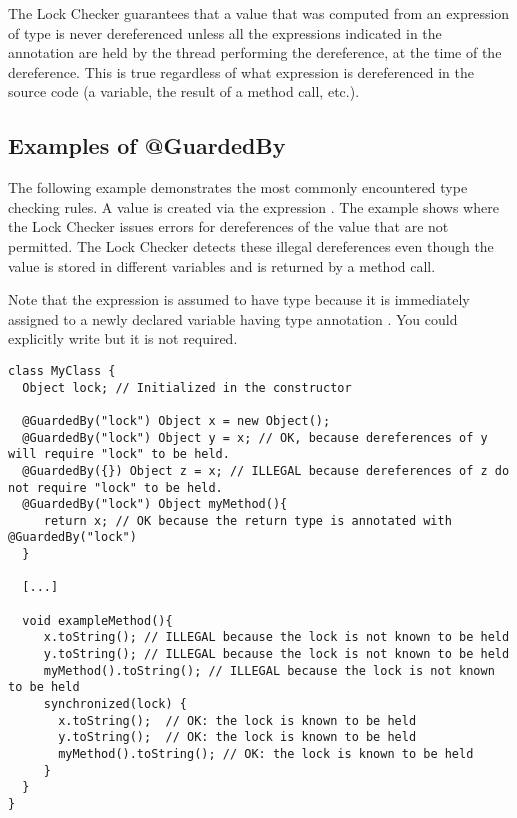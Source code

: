 The Lock Checker guarantees that a value that was computed from an expression of  type is
never dereferenced unless all the expressions indicated in the
 annotation are held by the thread performing the
dereference, at the time of the dereference.  This is true regardless of what
expression is dereferenced in the source code (a variable, the result of a method call, etc.).

\subsection{Examples of @GuardedBy\label{lock-examples-guardedby}}

The following example demonstrates the most commonly encountered
type checking rules.  A value is created via the expression
.  The example shows where the Lock Checker issues errors
for dereferences of the value that are not permitted.  The Lock Checker
detects these illegal dereferences even though the value is stored in
different variables and is returned by a method call.

Note that the expression  is assumed to have type 
because it is immediately assigned to a newly declared
variable having type annotation .  You could
explicitly write  but it is not
required.

\begin{Verbatim}
class MyClass {
  Object lock; // Initialized in the constructor

  @GuardedBy("lock") Object x = new Object();
  @GuardedBy("lock") Object y = x; // OK, because dereferences of y will require "lock" to be held.
  @GuardedBy({}) Object z = x; // ILLEGAL because dereferences of z do not require "lock" to be held.
  @GuardedBy("lock") Object myMethod(){
     return x; // OK because the return type is annotated with @GuardedBy("lock")
  }

  [...]

  void exampleMethod(){
     x.toString(); // ILLEGAL because the lock is not known to be held
     y.toString(); // ILLEGAL because the lock is not known to be held
     myMethod().toString(); // ILLEGAL because the lock is not known to be held
     synchronized(lock) {
       x.toString();  // OK: the lock is known to be held
       y.toString();  // OK: the lock is known to be held
       myMethod().toString(); // OK: the lock is known to be held
     }
  }
}
\end{Verbatim}


